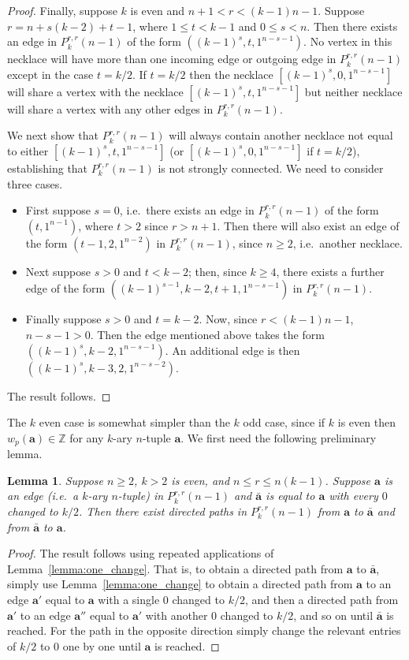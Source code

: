 \documentclass[a4paper,11pt]{article}
\theoremstyle{plain}
\newtheorem{lemma}{Lemma}[section]
\theoremstyle{definition}
\theoremstyle{remark}
\begin{document}
\begin{proof}
Finally, suppose $k$ is even and $n+1< r< (k-1)n-1$.  Suppose $r=n+s(k-2)+t-1$, where $1\leq t<k-1$
and $0\leq s<n$.  Then there exists an edge in $P_k^{r,r}(n-1)$ of the form
$((k-1)^s,t,1^{n-s-1})$. No vertex in this necklace will have more than one incoming edge or
outgoing edge in $P_k^{r,r}(n-1)$ except in the case $t=k/2$.  If $t=k/2$ then the necklace
$[(k-1)^s,0,1^{n-s-1}]$ will share a vertex with the necklace $[(k-1)^s,t,1^{n-s-1}]$ but neither
necklace will share a vertex with any other edges in $P_k^{r,r}(n-1)$.

We next show that $P_k^{r,r}(n-1)$ will always contain another necklace not equal to either
$[(k-1)^s,t,1^{n-s-1}]$ (or $[(k-1)^s,0,1^{n-s-1}]$ if $t=k/2$), establishing that $P_k^{r,r}(n-1)$
is not strongly connected. We need to consider three cases.
\begin{itemize}
\item First suppose $s=0$, i.e.\ there exists an edge in $P_k^{r,r}(n-1)$ of the form
    $(t,1^{n-1})$, where $t>2$ since $r>n+1$.  Then there will also exist an edge of the form
    $(t-1,2,1^{n-2})$ in $P_k^{r,r}(n-1)$, since $n\geq2$, i.e.\ another necklace.
\item Next suppose $s>0$ and $t<k-2$; then, since $k\geq4$, there exists a further edge of the
    form $((k-1)^{s-1},k-2,t+1,1^{n-s-1})$ in $P_k^{r,r}(n-1)$.
\item Finally suppose $s>0$ and $t=k-2$.  Now, since $r< (k-1)n-1$, $n-s-1>0$.  Then the edge
    mentioned above takes the form $((k-1)^s,k-2,1^{n-s-1})$.  An additional edge is then
    $((k-1)^s,k-3,2,1^{n-s-2})$.
\end{itemize}
The result follows.
\end{proof}


The $k$ even case is somewhat simpler than the $k$ odd case, since if $k$ is even then
$w_p(\mathbf{a})\in\mathbb{Z}$ for any $k$-ary $n$-tuple $\mathbf{a}$.  We first need the following
preliminary lemma.

\begin{lemma}  \label{lemma:change_zeros_to_half_k}
Suppose $n\geq2$, $k>2$ is even, and $n\leq r\leq n(k-1)$. Suppose $\mathbf{a}$ is an edge (i.e.\ a
$k$-ary $n$-tuple) in $P_k^{r,r}(n-1)$ and $\bar{\mathbf{a}}$ is equal to $\mathbf{a}$ with every
$0$ changed to $k/2$. Then there exist directed paths in $P_k^{r,r}(n-1)$ from $\mathbf{a}$ to
$\bar{\mathbf{a}}$ and from $\bar{\mathbf{a}}$ to $\mathbf{a}$.
\end{lemma}

\begin{proof}
The result follows using repeated applications of Lemma~\ref{lemma:one_change}.  That is, to obtain
a directed path from $\mathbf{a}$ to $\bar{\mathbf{a}}$, simply use Lemma~\ref{lemma:one_change} to
obtain a directed path from $\mathbf{a}$ to an edge $\mathbf{a}'$ equal to $\mathbf{a}$ with a
single $0$ changed to $k/2$, and then a directed path from $\mathbf{a}'$ to an edge $\mathbf{a}''$
equal to $\mathbf{a}'$ with another $0$ changed to $k/2$, and so on until $\bar{\mathbf{a}}$ is
reached.  For the path in the opposite direction simply change the relevant entries of $k/2$ to $0$
one by one until $\mathbf{a}$ is reached.
\end{proof}
\end{document}

